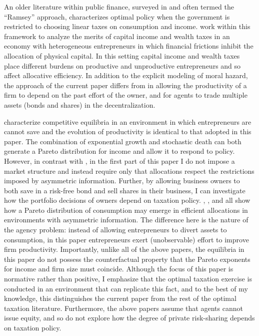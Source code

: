 \documentclass[11pt]{article}
\theoremstyle{plain}
\begin{document}
An older literature within public finance, surveyed in \cite{chari_optimal_1999} and often termed the ``Ramsey'' approach, characterizes optimal policy when the government is restricted to choosing linear taxes on consumption and income. \cite{guvenen_use_2019} work within this framework to analyze the merits of capital income and wealth taxes in an economy with heterogeneous entrepreneurs in which financial frictions inhibit the allocation of physical capital. In this setting capital income and wealth taxes place different burdens on productive and unproductive entrepreneurs and so affect allocative efficiency. In addition to the explicit modeling of moral hazard, the approach of the current paper differs from \cite{guvenen_use_2019} in allowing the productivity of a firm to depend on the past effort of the owner, and for agents to trade multiple assets (bonds and shares) in the decentralization.


\cite{jones_schumpeterian_2018} characterize competitive equilibria in an environment in which entrepreneurs are cannot save and the evolution of productivity is identical to that adopted in this paper. The combination of exponential growth and stochastic death can both generate a Pareto distribution for income and allow it to respond to policy. However, in contrast with \cite{jones_schumpeterian_2018}, in the first part of this paper I do not impose a market structure and instead require only that allocations respect the restrictions imposed by asymmetric information. Further, by allowing business owners to both save in a risk-free bond and sell shares in their business, I can investigate how the portfolio decisions of owners depend on taxation policy. \cite{ai_quantitative_2022}, \cite{shourideh_optimal_2013}, and \cite{phelan_optimality_2022} all show how a Pareto distribution of consumption may emerge in efficient allocations in environments with asymmetric information. The difference here is the nature of the agency problem: instead of allowing entrepreneurs to divert assets to consumption, in this paper entrepreneurs exert (unobservable) effort to improve firm productivity. Importantly, unlike all of the above papers, the equilibria in this paper do not possess the counterfactual property that the Pareto exponents for income and firm size must coincide. Although the focus of this paper is normative rather than positive, I emphasize that the optimal taxation exercise is conducted in an environment that can replicate this fact, and to the best of my knowledge, this distinguishes the current paper from the rest of the optimal taxation literature. Furthermore, the above papers assume that agents cannot issue equity, and so do not explore how the degree of private risk-sharing depends on taxation policy. 
\end{document}
